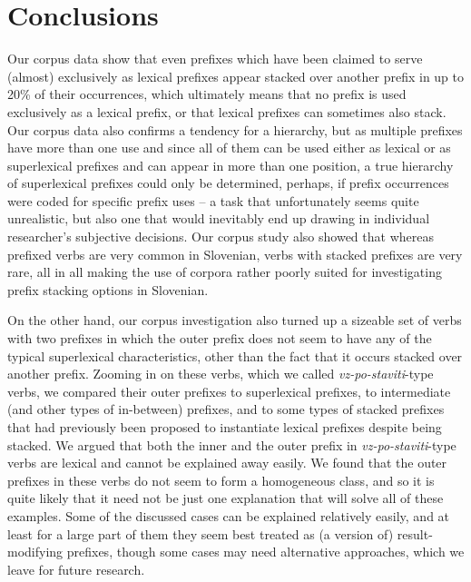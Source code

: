 \documentclass[output=paper,colorlinks,citecolor=brown]{langscibook}
\begin{document}
           
\section{Conclusions}\label{mar+:sec:conclusion}

 Our corpus data show that even prefixes which have been claimed to serve (almost) exclusively as lexical prefixes appear stacked over another prefix in up to 20\% of their occurrences, which ultimately means that no prefix is used exclusively as a lexical prefix, or that lexical prefixes can sometimes also stack. Our corpus data also confirms a tendency for a hierarchy, but as multiple  prefixes have more than one use and since all of them can be used either as lexical or as superlexical prefixes and can appear in more than one position, a true hierarchy of superlexical prefixes could only be determined, perhaps, if prefix occurrences were coded for specific prefix uses -- a task that unfortunately seems quite unrealistic, but also one that would inevitably end up drawing in individual researcher's subjective decisions. Our corpus study also showed that whereas prefixed verbs are very common in Slovenian, verbs with stacked prefixes are very rare, all in all making the use of corpora rather poorly suited for investigating prefix stacking options in Slovenian.


On the other hand, our corpus investigation also turned up a sizeable set of verbs with two prefixes in which the outer prefix does not seem to have any of the typical superlexical characteristics, other than the fact that it occurs stacked over another prefix. Zooming in on these verbs, which we called \textit{vz-po-staviti}-type verbs, we compared their outer prefixes to superlexical prefixes, to intermediate (and other types of in-between) prefixes, and to some types of stacked prefixes that had previously been proposed to instantiate lexical prefixes despite being stacked. We argued that both the inner and the outer prefix in \textit{vz-po-staviti}-type verbs are lexical and cannot be explained away easily. We found that the outer prefixes in these verbs do not seem to form a homogeneous class, and so it is quite likely that it need not be just one explanation that will solve all of these examples. Some of the discussed cases can be explained relatively easily, and at least for a large part of them they seem best treated as (a version of) result-modifying prefixes, though some cases may need alternative approaches, which we leave for future research.
\end{document}
